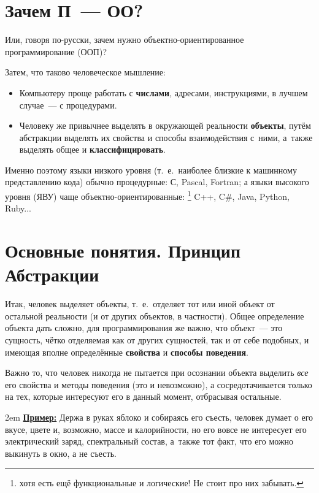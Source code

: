 \documentclass[a4paper, 14pt, titlepage]{extarticle}
\newcommand{\strong}[1]{\textbf{#1}}
\newcommand{\ie}{т.~е.~}
\newenvironment{indented}%
    { \begingroup %
        \noindent %
        \leftskip2em %
        \rightskip\leftskip }%
    { \par\endgroup }
\newenvironment{example}%
    { \begin{indented} %
        \color{dkgreen} %
        \small %
        \textbf{\underline{Пример:}} }%
    { \end{indented} }
\begin{document}
  \section{Зачем П~--- ОО?}

  Или, говоря по-русски, зачем нужно объектно-ориентированное программирование (ООП)?

  Затем, что таково человеческое мышление:
  \begin{itemize}
    \item Компьютеру проще работать с \strong{числами}, адресами, инструкциями, в лучшем случае~--- с процедурами.
    \item Человеку же привычнее выделять в окружающей реальности \strong{объекты}, путём абстракции
    выделять их свойства и способы взаимодействия с~ними, а~также выделять общее и
    \strong{классифицировать}.
  \end{itemize}

  Именно поэтому языки низкого уровня (\ie наиболее близкие к машинному представлению кода) обычно %
  процедурные: С, Pascal, Fortran; а языки высокого уровня (ЯВУ) чаще объектно-ориентированные:
  \footnote{хотя есть ещё функциональные и логические! Не стоит про них забывать.}
  C++, C\#, Java, Python, Ruby...

  \section{Основные понятия. Принцип Абстракции}\label{sec:basic_concepts}

  Итак, человек выделяет объекты, \ie отделяет тот или иной объект от остальной реальности (и от
  других объектов, в частности). Общее определение объекта дать сложно, для программирования же
  важно, что объект~--- это сущность, чётко отделяемая как от других сущностей, так и от себе
  подобных, и имеющая вполне определённые \strong{свойства} и \strong{способы поведения}.

  Важно то, что человек никогда не пытается при осознании объекта выделить \emph{все} его свойства и
  методы поведения (это и невозможно), а сосредотачивается только на тех, которые интересуют его в
  данный момент, отбрасывая остальные.

  \begin{example}
    Держа в руках яблоко и собираясь его съесть, человек думает о его вкусе, цвете и, возможно,
    массе и калорийности, но его вовсе не интересует его электрический заряд, спектральный состав,
    а~также тот факт, что его можно выкинуть в окно, а не съесть.
  \end{example}
\end{document}
